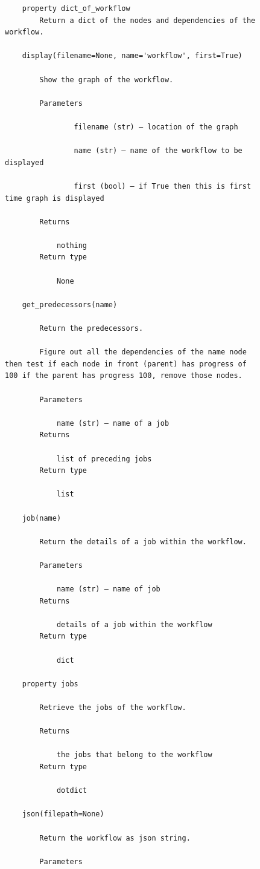\begin{figure}[htb]
\begin{verbatim}
    property dict_of_workflow
        Return a dict of the nodes and dependencies of the workflow.

    display(filename=None, name='workflow', first=True)

        Show the graph of the workflow.

        Parameters

                filename (str) – location of the graph

                name (str) – name of the workflow to be displayed

                first (bool) – if True then this is first time graph is displayed

        Returns

            nothing
        Return type

            None

    get_predecessors(name)

        Return the predecessors.

        Figure out all the dependencies of the name node then test if each node in front (parent) has progress of 100 if the parent has progress 100, remove those nodes.

        Parameters

            name (str) – name of a job
        Returns

            list of preceding jobs
        Return type

            list

    job(name)

        Return the details of a job within the workflow.

        Parameters

            name (str) – name of job
        Returns

            details of a job within the workflow
        Return type

            dict

    property jobs

        Retrieve the jobs of the workflow.

        Returns

            the jobs that belong to the workflow
        Return type

            dotdict

    json(filepath=None)

        Return the workflow as json string.

        Parameters


\end{verbatim}
\end{figure}
